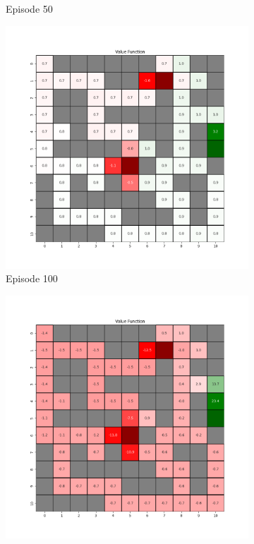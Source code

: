 \documentclass{assignment}
\begin{document}
\begin{figure}[H]
\begin{subfigure}{0.3\textwidth}
    \caption{Episode 50}
    \end{subfigure}\hfill
    \begin{subfigure}{0.3\textwidth}
        \includegraphics[width=\textwidth]{figures/value_td/alpha_sweep/value_function_alpha_0.001_gamma_0.95_epsilon_0.2_iteration_100.png}
    \caption{Episode 100}
    \end{subfigure}
    \begin{subfigure}{0.3\textwidth}
        \includegraphics[width=\textwidth]{figures/value_td/alpha_sweep/value_function_alpha_0.001_gamma_0.95_epsilon_0.2_iteration_1000.png}

\end{subfigure}
\end{figure}
\end{document}
